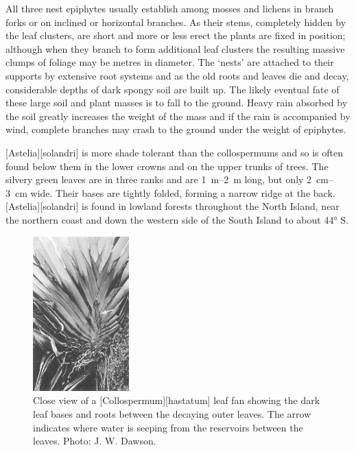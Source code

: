 All three nest epiphytes usually establish among mosses and lichens in branch forks or on inclined or horizontal branches.
As their stems, completely hidden by the leaf clusters, are short and more or less erect the plants are fixed in position; although when they branch to form additional leaf clusters the resulting massive clumps of foliage may be metres in diameter.
The `nests' are attached to their supports by extensive root systems and as the old roots and leaves die and decay, considerable depths of dark spongy soil are built up.
The likely eventual fate of these large soil and plant masses is to fall to the ground.
Heavy rain absorbed by the soil greatly increases the weight of the mass and if the rain is accompanied by wind, complete branches may crash to the ground under the weight of epiphytes.

[Astelia][solandri] is more shade tolerant than the collospermums and so is often found below them in the lower crowns and on the upper trunks of trees.
The silvery green leaves are in three ranks and are \SIrange{1}{2}{\metre} long, but only \SIrange{2}{3}{\centi\metre} wide.
Their bases are tightly folded, forming a narrow ridge at the back. [Astelia][solandri] is found in lowland forests throughout the North Island, near the northern coast and down the western side of the South Island to about \ang{44} S.

\begin{figure}
	\includegraphics[width=0.33\textwidth]{graphics/figure41collospermum.jpg}
	\centering
	\caption[Close view of a Collospermum hastatum leaf fan]{Close view of a [Collospermum][hastatum] leaf fan showing the dark leaf bases and roots between the decaying outer leaves.
	The arrow indicates where water is seeping from the reservoirs between the leaves.
	Photo: J. W. Dawson.}%
	\label{fig:41collospermum}
\end{figure}

